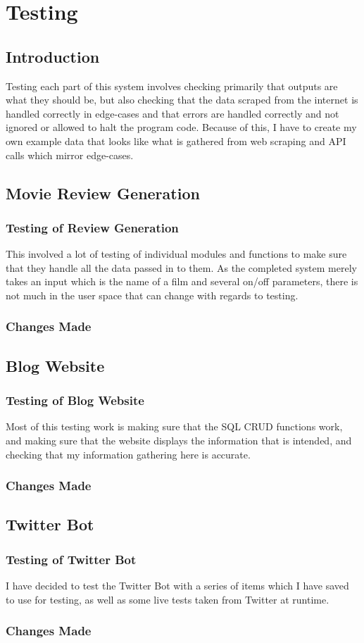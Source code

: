 \chapter{\label{ch:5-testing} Testing}


\section{Introduction}
Testing each part of this system involves checking primarily that outputs are what they should be, but also checking that the data scraped from the internet is handled correctly in edge-cases and that errors are handled correctly and not ignored or allowed to halt the program code. Because of this, I have to create my own example data that looks like what is gathered from web scraping and API calls which mirror edge-cases.

\section{Movie Review Generation}
\subsection{Testing of Review Generation}
This involved a lot of testing of individual modules and functions to make sure that they handle all the data passed in to them. As the completed system merely takes an input which is the name of a film and several on/off parameters, there is not much in the user space that can change with regards to testing.
\subsection{Changes Made}
\section{Blog Website}
\subsection{Testing of Blog Website}
Most of this testing work is making sure that the SQL CRUD functions work, and making sure that the website displays the information that is intended, and checking that my information gathering here is accurate.
\subsection{Changes Made}
\section{Twitter Bot}
\subsection{Testing of Twitter Bot}
I have decided to test the Twitter Bot with a series of items which I have saved to use for testing, as well as some live tests taken from Twitter at runtime. 
\subsection{Changes Made}
